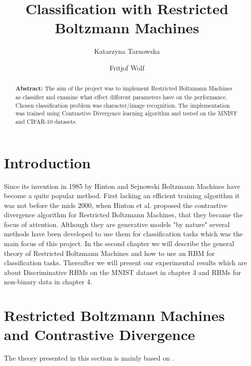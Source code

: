 \documentclass[a4paper]{scrartcl}
\begin{document}
\title{Classification with Restricted Boltzmann Machines}
\author{Katarzyna Tarnowska \and Fritjof Wolf}
\maketitle

\begin{abstract}
\textbf{Abstract:}
The aim of the project was to implement Restricted Boltzmann Machines as classifier and examine what effect different parameters have on the performance. Chosen classification problem was character/image recognition. The implementation was trained using Contrastive Divergence learning algorithm and tested on the MNIST and CIFAR-10 datasets. 
\end{abstract}
\newpage

\section{Introduction}
Since its invention in 1985 by Hinton and Sejnowski Boltzmann Machines have become a quite popular method. First lacking an efficient training algorithm it was not before the mids 2000, when Hinton et al. proposed the contrastive divergence algorithm for Restricted Boltzmann Machines, that they became the focus of attention. Although they are generative models "by nature" several methods have been developed to use them for classification tasks which was the main focus of this project.
In the second chapter we will describe the general theory of Restricted Boltzmann Machines and how to use an RBM for classification tasks. Thereafter we will present our experimental results which are about Discriminative RBMs on the MNIST dataset in chapter 3 and RBMs for non-binary data in chapter 4.

\newpage

\section{Restricted Boltzmann Machines and Contrastive Divergence}
The theory presented in this section is mainly based on \cite{Hinton}.
\end{document}
